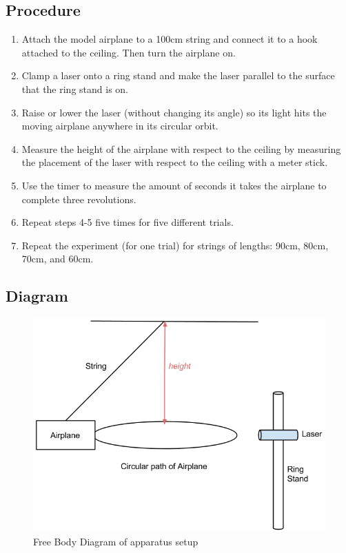 \documentclass[10pt, letterpaper]{article}
\begin{document}
\subsection{Procedure}
\begin{enumerate}
  \item Attach the model airplane to a 100cm string and connect it to a hook attached to the ceiling. Then turn the airplane on.
  \item Clamp a laser onto a ring stand and make the laser parallel to the surface that the ring stand is on.
  \item Raise or lower the laser (without changing its angle) so its light hits the moving airplane anywhere in its circular orbit.
  \item Measure the height of the airplane with respect to the ceiling by measuring the placement of the laser with respect to the ceiling with a meter stick.
  \item Use the timer to measure the amount of seconds it takes the airplane to complete three revolutions.
  \item Repeat steps 4-5 five times for five different trials.
  \item Repeat the experiment (for one trial) for strings of lengths: 90cm, 80cm, 70cm, and 60cm.
\end{enumerate}

\subsection{Diagram}
\begin{figure}[!htb]
\centering
\includegraphics[scale=0.5]{Lab1_drawing.png}
\caption{Free Body Diagram of apparatus setup}
\end{figure}
\end{document}
